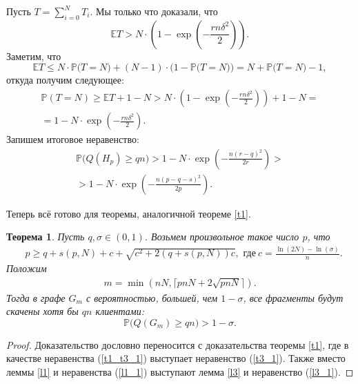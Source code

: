 \documentclass{matmex-diploma-custom}
\newcommand{\Expect}{\mathbb E}
\newcommand{\PRob}{\mathbb P}
\newcommand{\leqs}{\leqslant}
\newcommand{\geqs}{\geqslant}
\newtheorem{theorem}{Теорема}
\theoremstyle{named}
\begin{document}
Пусть $T = \sum\limits_{i = 0}^N T_i$. Мы только что доказали, что
\begin{equation}
\Expect T > N \cdot \left( 1 - \exp \left( - \frac{rn \delta^2}{2} \right) \right).
\end{equation}
Заметим, что 
\begin{equation}
\Expect T \leqs N \cdot \PRob\big(T = N\big) + (N-1) \cdot \Big(1 - \PRob\big(T = N\big)\Big) = N + \PRob\big(T = N\big) - 1,
\end{equation}
откуда получим следующее:
\begin{equation}\begin{aligned}
\PRob(T = N) \geqs \Expect T + 1 - N > N \cdot \left(1 - \exp \left( - \frac{rn \delta^2}{2} \right)\right)  + 1 - N
=
	\\
=
1 - N \cdot \exp \left( - \frac{rn \delta^2}{2} \right).
\end{aligned}\end{equation}
Запишем итоговое неравенство:
\begin{equation}\label{t3_1} \begin{aligned}
\PRob\Big(Q(H_p) \geqs qn \Big) 
	> 
1 - N \cdot \exp\left(- \frac{n (r-q)^2}{2r} \right)
	>
\\ 
	>  
1 - N \cdot \exp\left(- \frac{n (p - q - s)^2}{2p} \right). 
\end{aligned}\end{equation}

\smallskip

Теперь всё готово для теоремы, аналогичной теореме \ref{t1}.

\begin{theorem}\label{t3}
Пусть $q, \sigma \in (0, 1)$. Возьмем произвольное такое число $p$, что 
\begin{align}
& p \geqs q + s(p, N) + c + \sqrt{c^2+2(q+s(p, N))c}, \text{ где} \label{t3_2}
~c = \frac{\ln(2N) - \ln(\sigma)}{n}.
\end{align}
Положим
\begin{align}
m = \min(nN, \lceil pnN + 2\sqrt{pnN} \rceil).
\end{align}
Тогда в графе $G_m$ с вероятностью, большей, чем $1 - \sigma$, все фрагменты будут скачены хотя бы $qn$ клиентами:
\begin{equation}\label{t3_3}
\PRob\big(Q(G_m) \geqs qn\big) > 1 - \sigma.
\end{equation}
\end{theorem}

\begin{proof}
Доказательство дословно переносится с доказательства теоремы \ref{t1}, 
где в качестве неравенства (\ref{t1_t3_1}) выступает неравенство (\ref{t3_1}). 
Также вместо леммы \ref{l1} и неравенства (\ref{l1_1}) выступают лемма \ref{l3} и неравенство (\ref{l3_1}).
\end{proof}
\end{document}
